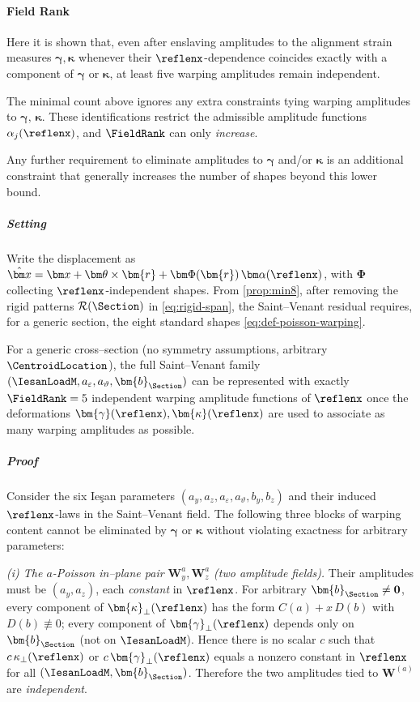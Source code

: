 \paragraph{Field Rank}

Here it is shown that, even after enslaving amplitudes to the alignment strain measures \(\bm{\gamma},\bm{\kappa}\) whenever their
\(\reflenx\)-dependence coincides exactly with a component of \(\bm{\gamma}\) or \(\bm{\kappa}\), at least five warping amplitudes remain independent.

The minimal count above ignores any extra constraints tying warping amplitudes to \(\bm\gamma,\,\bm\kappa\). 
These identifications restrict the admissible amplitude functions \(\alpha_j(\reflenx)\), and \(\FieldRank\) can only \emph{increase}.

Any further requirement to eliminate amplitudes to \(\bm\gamma\) and/or \(\bm\kappa\) is an additional constraint that generally increases the number of shapes beyond this lower bound.

\subparagraph{Setting}
Write the displacement as \(\hat{\bm x}=\bm x+\bm\theta\times\bm{r}+\bm\Phi(\bm{r})\,\bm\alpha(\reflenx)\), with \(\bm\Phi\) collecting
\(\reflenx\)-independent shapes. 
From \cref{prop:min8}, after removing the rigid patterns
\(\mathcal{R}(\Section)\) in \eqref{eq:rigid-span},
the Saint–Venant residual requires, for a generic section, the eight standard shapes \eqref{eq:def-poisson-warping}.

\begin{proposition}
For a generic cross–section (no symmetry assumptions, arbitrary \(\CentroidLocation\)), the full Saint–Venant family
\((\IesanLoadM,a_\varepsilon,a_\vartheta,\bm{b}_{\Section})\) can be represented with exactly \(\FieldRank = 5\) independent warping amplitude functions of \(\reflenx\)  once the deformations \(\bm{\gamma}(\reflenx),\bm{\kappa}(\reflenx)\) are used to associate as many warping amplitudes as possible. 
\end{proposition}

\subparagraph{Proof}
Consider the six Ie\c{s}an parameters \((a_y,a_z,a_\varepsilon,a_\vartheta,b_y,b_z)\) and their induced
\(\reflenx\)-laws in the Saint–Venant field. 
The following three blocks of warping content cannot be eliminated by \(\bm{\gamma}\) or \(\bm{\kappa}\)
without violating exactness for arbitrary parameters:

\medskip
\emph{(i) The \(a\)-Poisson in–plane pair \(\bm{W}^a_y,\bm{W}^a_z\) (two amplitude fields).}
Their amplitudes must be \((a_y,a_z)\), each \emph{constant} in \(\reflenx\).
For arbitrary \(\bm{b}_{\Section}\neq \mathbf{0}\), every component of \(\bm{\kappa}_\perp(\reflenx)\) has the form
\(C(a)+x\,D(b)\) with \(D(b)\not\equiv 0\);
every component of \(\bm{\gamma}_\perp(\reflenx)\) depends only on \(\bm{b}_{\Section}\) (not on \(\IesanLoadM\)).
Hence there is no scalar \(c\) such that \(c\,\kappa_\perp(\reflenx)\) or \(c\,\bm{\gamma}_\perp(\reflenx)\) equals a nonzero constant in \(\reflenx\) for all
\((\IesanLoadM,\bm{b}_{\Section})\). Therefore the two amplitudes tied to \(\bm{W}^{(a)}\) are \emph{independent}.

